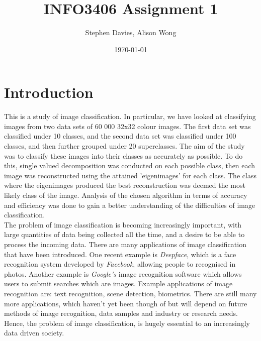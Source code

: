 \documentclass[%
 reprint,
 amsmath,amssymb,
 aps,
]{revtex4-1}
\begin{document}

\title{INFO3406 Assignment 1}%

\author{Stephen Davies, Alison Wong}
%

\date{\today}%

\begin{abstract}
		
\end{abstract}

\maketitle


\section{\label{sec:level1}Introduction}
\indent This is a study of image classification. In particular, we have looked at classifying images from two data sets of 60 000 32x32 colour images. The first data set was classified under 10 classes, and the second data set was classified under 100 classes, and then further grouped under 20 superclasses. The aim of the study was to classify these images into their classes as accurately as possible. To do this, single valued decomposition was conducted on each possible class, then each image was reconstructed using the attained 'eigenimages' for each class. The class where the eigenimages produced the best reconstruction was deemed the most likely class of the image. Analysis of the chosen algorithm in terms of accuracy and efficiency was done to gain a better understanding of the difficulties of image classification. 
\\ \indent The problem of image classification is becoming increasingly important, with large quantities of data being collected all the time, and a desire to be able to process the incoming data. There are many applications of image classification that have been introduced. One recent example is \textit{Deepface}, which is a face recognition system developed by \textit{Facebook}, allowing people to recognised in photos. Another example is \textit{Google's} image recognition software which allows users to submit searches which are images. Example applications of image recognition are: text recognition, scene detection, biometrics. There are still many more applications, which haven't yet been though of but will depend on future methods of image recognition, data samples and industry or research needs. Hence, the problem of image classification, is hugely essential to an increasingly data driven society.
\end{document}
